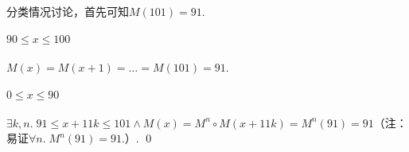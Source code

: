 \begin{pf} \rm 分类情况讨论，首先可知$M(101)=91$. 
\paragraph{$90 \le x\le 100$} \quad\quad $M(x)=M(x+1)=\dots=M(101)=91$.
\paragraph{$0 \le x\le 90$} \quad\quad $\exists k,n.\;91\le x+11k\le 101 \wedge M(x)=M^n\circ M(x+11k)=M^n(91)=91$（注：易证$\forall n.\;M^n(91)=91.$）.
    \qed
\end{pf}
